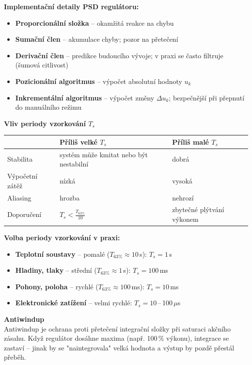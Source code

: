 \documentclass[a4paper,10pt]{article}
\begin{document}
\begin{vysvetlenibox}
\textbf{Implementační detaily PSD regulátoru:}
\begin{itemize}[noitemsep, leftmargin=1.4em, topsep=4pt]
    \item \textbf{Proporcionální složka} -- okamžitá reakce na chybu
    \item \textbf{Sumační člen} -- akumulace chyby; pozor na přetečení
    \item \textbf{Derivační člen} -- predikce budoucího vývoje;
          v praxi se často filtruje (šumová citlivost)
    \item \textbf{Pozicionální algoritmus} -- výpočet absolutní hodnoty $u_k$
    \item \textbf{Inkrementální algoritmus} -- výpočet změny $\Delta u_k$;
          bezpečnější při přepnutí do manuálního režimu
\end{itemize}

\textbf{Vliv periody vzorkování $T_s$}

\begin{center}
\begin{tabularx}{0.95\linewidth}{@{} l X X @{}}
    \toprule
    & \textbf{Příliš velké $T_s$} & \textbf{Příliš malé $T_s$} \\
    \midrule
    Stabilita     & systém může kmitat nebo být nestabilní & dobrá \\
    Výpočetní zátěž & nízká & vysoká \\
    Aliasing      & hrozba & nehrozí \\
    Doporučení    & $T_s < \frac{T_{63\%}}{10}$
                  & zbytečné plýtvání výkonem \\
    \bottomrule
\end{tabularx}
\end{center}

\textbf{Volba periody vzorkování v praxi:}
\begin{itemize}[noitemsep, leftmargin=1.4em, topsep=4pt]
    \item \textbf{Teplotní soustavy} -- pomalé ($T_{63\%} \approx 10$\,s): $T_s = 1$\,s
    \item \textbf{Hladiny, tlaky} -- střední ($T_{63\%} \approx 1$\,s): $T_s = 100$\,ms
    \item \textbf{Pohony, poloha} -- rychlé ($T_{63\%} \approx 100$\,ms): $T_s = 10$\,ms
    \item \textbf{Elektronické zatížení} -- velmi rychlé: $T_s = 10$\,--\,100\,$\mu$s
\end{itemize}

\textbf{Antiwindup}\\
Antiwindup je ochrana proti přetečení integrační složky při saturaci
akčního zásahu. Když regulátor dosáhne maxima (např. 100\,\% výkonu),
integrace se zastaví -- jinak by se "naintegrovala" velká hodnota
a výstup by pozdě přestál přeběh.


\end{vysvetlenibox}
\end{document}
